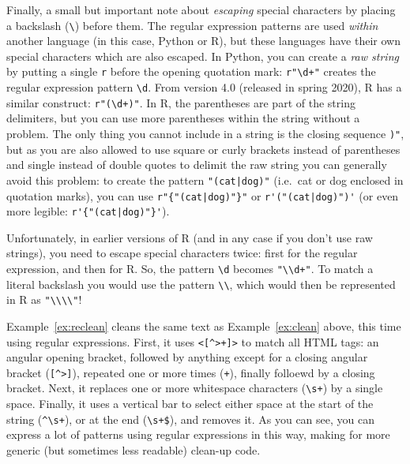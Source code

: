 Finally, a small but important note about \emph{escaping} special characters by placing a backslash (\verb|\|) before them.
The regular expression patterns are used \emph{within} another language (in this case, Python or R), but these languages have their own
special characters which are also escaped. In Python, you can create a \emph{raw string} by putting a single \verb|r| before the opening quotation mark:
\verb|r"\d+"| creates the regular expression pattern \verb|\d|.
From version 4.0 (released in spring 2020), R has a similar construct: \verb|r"(\d+)"|. In R, the parentheses are part of the string delimiters, but you can use more parentheses within the string without a problem.
The only thing you cannot include in a string is the closing sequence \verb|)"|, but as you are also allowed to use square or curly brackets instead of parentheses and single instead of double quotes to delimit the raw string you can generally avoid this problem:
to create the pattern \verb+"(cat|dog)"+ (i.e.\ cat or dog enclosed in quotation marks), you can use \verb+r"{"(cat|dog)"}"+ or \verb+r'("(cat|dog)")'+
(or even more legible: \verb+r'{"(cat|dog)"}'+).

Unfortunately, in earlier versions of R (and in any case if you don't use raw strings), you need to escape special characters twice:
first for the regular expression, and then for R. So, the pattern \verb|\d| becomes \verb|"\\d+"|. To match a literal backslash you would use the pattern \verb|\\|,
which would then be represented in R as \verb|"\\\\"|!

Example~\ref{ex:reclean} cleans the same text as Example~\ref{ex:clean} above, this time using regular expressions.
First, it uses \verb|<[^>+]>| to match all HTML tags: an angular opening bracket, followed by anything except for a closing angular bracket (\verb|[^>]|), repeated one or more times (\verb|+|),
finally folloewd by a closing bracket.
Next, it replaces one or more whitespace characters (\verb|\s+|) by a single space.
Finally, it uses a vertical bar to select either space at the start of the string (\verb|^\s+|), or at the end  (\verb|\s+$|), and removes it. 
As you can see, you can express a lot of patterns using regular expressions in this way, making for more generic (but sometimes less readable) clean-up code. 


